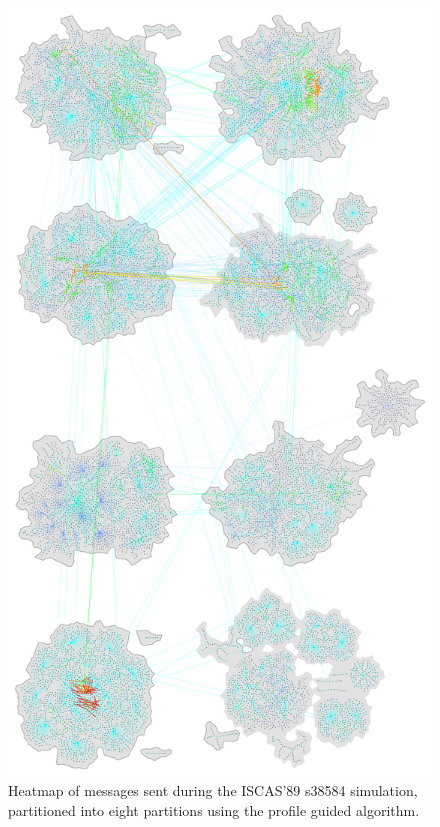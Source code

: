 \documentclass[11pt]{book}
\begin{document}
\begin{figure}
\centering
\includegraphics[width=\textwidth,height=0.9\textheight,keepaspectratio]{figs/s38584_8part}
\caption{Heatmap of messages sent during the ISCAS'89 s38584 simulation, partitioned into eight partitions using the profile guided algorithm.}
\end{figure}
\end{document}
